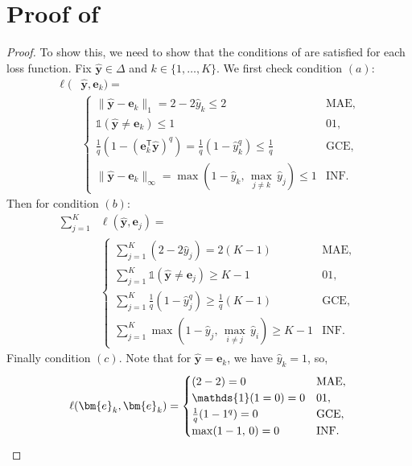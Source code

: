 \documentclass[letterpaper]{article} %
\newcommand{\by}{{\bm{y}}}
\newcommand{\be}{{\bm{e}}}
\newcommand{\T}{{\mathsf{T}}}
\newcommand{\I}{\mathds{1}}
\newcommand{\simplex}{\Delta}
\begin{document}
\section{Proof of }
\label{app:cor_robust_losses}
\rl*
\begin{proof}
To show this, we need to show that the conditions of  are satisfied for each loss function. 
Fix 
$\widehat{\by}\in\simplex$ 
and 
$k\in\{1,\ldots,K\}$. We first check condition $(a)$: 
\begin{align*}
    \ell( & \widehat{\by}  ,\be_k) =
    \\
    &\begin{cases}
        \|\widehat{\by}-\be_k\|_1 = 2-2\widehat{y}_k \leq 2 & \mathrm{MAE},
        \\
        \I(\widehat{\by}\ne \be_k)  \leq 1 & 01,
        \\
        \frac{1}{q}(1-(\be_k^\T\widehat{\by})^q) = \frac{1}{q}(1-\widehat{y}_k^q) \leq \frac{1}{q} & \mathrm{GCE},
        \\
        \|\widehat{\by}-\be_k\|_\infty = \max(1-\widehat{y}_k,\,\underset{j\ne k}{\max}\,\widehat{y}_j)\leq 1 & \mathrm{INF}.
    \end{cases}
\end{align*}
Then for condition $(b)$:
\begin{align*}
    \sum_{j=1}^K & \ell(\widehat{\by},\be_j) = 
        \\
        &\begin{cases}
        \sum_{j=1}^K (2-2\widehat{y}_j) = 2(K-1) & \mathrm{MAE},
        \\
        \sum_{j=1}^K \I(\widehat{\by}\ne \be_j) \geq K-1 & 01,
        \\
        \sum_{j=1}^K \frac{1}{q}(1-\widehat{y}_j^q) 
        \geq 
        \frac{1}{q}(K-1)   & \mathrm{GCE},
        \\
        \sum_{j=1}^K \max(1-\widehat{y}_j,\,\underset{i\ne j}{\max}\,\widehat{y}_i)
        \geq 
        K-1 & \mathrm{INF}.
    \end{cases}
\end{align*}
Finally condition $(c)$. Note that for $\widehat{\by}=\be_k$, we have $\widehat{y}_k=1$, so,
\[
    \ell(\be_k,\be_k) = 
        \begin{cases}
        (2-2) = 0 & \mathrm{MAE},
        \\
        \I(1=0) = 0 & 01,
        \\
        \frac{1}{q}(1-1^q) =0   & \mathrm{GCE},
        \\
        \max(1-1,\,0) = 0 & \mathrm{INF}.
    \end{cases} \qedhere
\]
\end{proof}
\end{document}
